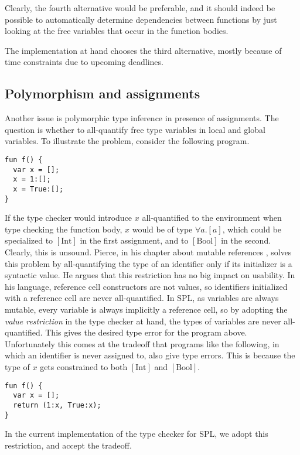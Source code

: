 \documentclass[a4paper]{article}
\begin{document}
Clearly, the fourth alternative would be preferable, and it should indeed be
possible to automatically determine dependencies between functions by just
looking at the free variables that occur in the function bodies.

The implementation at hand chooses the third alternative, mostly because of time
constraints due to upcoming deadlines.

\subsection{Polymorphism and assignments}

Another issue is polymorphic type inference in presence of assignments.  The
question is whether to all-quantify free type variables in local and global
variables.  To illustrate the problem, consider the following program.

\begin{verbatim}
fun f() {
  var x = [];
  x = 1:[];
  x = True:[];
}
\end{verbatim}

If the type checker would introduce $x$ all-quantified to the environment when
type checking the function body, $x$ would be of type $\forall a . [a]$, which
could be specialized to $[\text{Int}]$ in the first assignment, and to
$[\text{Bool}]$ in the second.  Clearly, this is unsound.  Pierce, in his
chapter about mutable references \cite{Pierce2002a}, solves this problem by
all-quantifying the type of an identifier only if its initializer is a
syntactic value.  He argues that this restriction has no big impact on
usability.  In his language, reference cell constructors are not values, so
identifiers initialized with a reference cell are never all-quantified.  In
SPL, as variables are always mutable, every variable is always implicitly a
reference cell, so by adopting the \emph{value restriction} in the type checker
at hand, the types of variables are never all-quantified.  This gives the
desired type error for the program above. Unfortunately this comes at the
tradeoff that programs like the following, in which an identifier is never
assigned to, also give type errors. This is because the type of $x$ gets
constrained to both $[\text{Int}]$ and $[\text{Bool}]$.

\begin{verbatim}
fun f() {
  var x = [];
  return (1:x, True:x);
}
\end{verbatim}

In the current implementation of the type checker for SPL, we adopt this
restriction, and accept the tradeoff.
\end{document}
